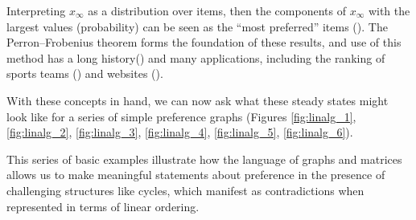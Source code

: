 Interpreting $x_{\infty}$ as a distribution over items, then the components of $x_{\infty}$ with the largest values (probability) can be seen as the ``most preferred'' items (\cite{paisley}).
The Perron–Frobenius theorem forms the foundation of these results, and use of this method has a long history(\cite{keener:1993}) and many applications, including the ranking of sports teams (\cite{landau:1915}) and websites (\cite{brin}).

\bigskip

With these concepts in hand, we can now ask what these steady states might look like for a series of simple preference graphs (Figures \ref{fig:linalg_1}, \ref{fig:linalg_2}, \ref{fig:linalg_3}, \ref{fig:linalg_4}, \ref{fig:linalg_5}, \ref{fig:linalg_6}).





This series of basic examples illustrate how the language of graphs and matrices allows us to make meaningful statements about preference in the presence of challenging structures like cycles, which manifest as contradictions when represented in terms of linear ordering.